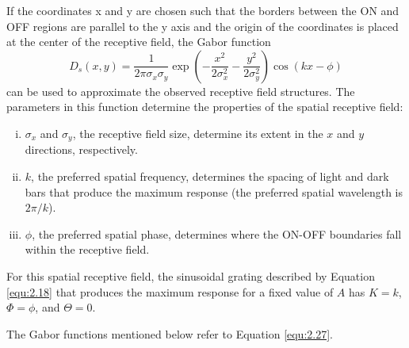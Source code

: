 \begin{exm}
  If the coordinates x and y are chosen such that the borders between the ON and OFF regions are parallel to the y axis and the origin of the coordinates is placed at the center of the receptive field, the Gabor function
  \begin{equation}
    \label{equ:2.27}
    D_s(x,y) = \frac{1}{2\pi\sigma_x\sigma_y}\exp\left(-\frac{x^2}{2\sigma_x^2}-\frac{y^2}{2\sigma_y^2}\right)\cos(kx-\phi)
  \end{equation}
  can be used to approximate the observed receptive field structures.
  The parameters in this function determine the properties of the spatial receptive field:
  \begin{enumerate}[(i)]
  \item $\sigma_x$ and $\sigma_y$, the receptive field size, determine its extent in the $x$ and $y$ directions, respectively.
  \item $k$, the preferred spatial frequency, determines the spacing of light and dark bars that produce the maximum response (the preferred spatial wavelength is $2\pi/k$).
  \item $\phi$, the preferred spatial phase, determines where the ON-OFF boundaries fall within the receptive field.
  \end{enumerate}
  For this spatial receptive field, the sinusoidal grating described by Equation \ref{equ:2.18} that produces the maximum response for a fixed value of $A$ has $K = k$, $\Phi = \phi$, and $\Theta = 0$.
\end{exm}

\begin{rem}
  The Gabor functions mentioned below refer to Equation \ref{equ:2.27}.
\end{rem}

